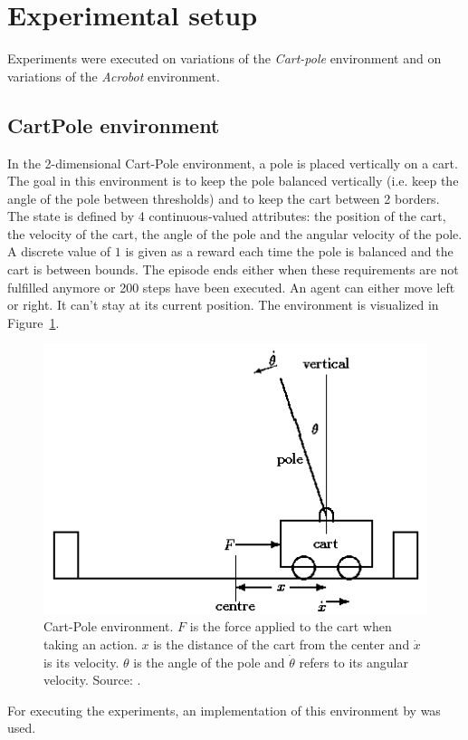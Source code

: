 \section{Experimental setup}
Experiments were executed on variations of the \textit{Cart-pole} environment and on variations of the \textit{Acrobot} environment.\\

\subsection{CartPole environment} %
\label{sub:cartpole_environment}
In the 2-dimensional Cart-Pole environment, a pole is placed vertically on a cart. The goal in this environment is to keep the pole balanced vertically (i.e. keep the angle of the pole between thresholds) and to keep the cart between 2 borders.
The state is defined by 4 continuous-valued attributes: the position of the cart, the velocity of the cart, the angle of the pole and the angular velocity of the pole.
A discrete value of $1$ is given as a reward each time the pole is balanced and the cart is between bounds.
The episode ends either when these requirements are not fulfilled anymore or 200 steps have been executed.
An agent can either move left or right. It can't stay at its current position.
The environment is visualized in Figure~\ref{fig:cartpole}.
\begin{figure}[htb]
    \centering
    \includegraphics[width=.6\linewidth]{images/cartpole.png}
    \caption[Cart-Pole environment]{Cart-Pole environment. $F$ is the force applied to the cart when taking an action. $x$ is the distance of the cart from the center and $\dot{x}$ is its velocity. $\theta$ is the angle of the pole and $\dot{\theta}$ refers to its angular velocity. Source: \cite{grant1990modelling}.}
    \label{fig:cartpole}
\end{figure}
For executing the experiments, an implementation of this environment by \cite{Brockman2016OpenAIGym} was used.\\

